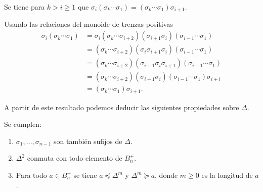\documentclass[bibtex, anon]{TEMat-article}
\begin{document}
\begin{lema}\label{anterior}
Se tiene para $k>i\geq 1$ que $\sigma_i(\sigma_k\cdots\sigma_1)=(\sigma_k\cdots\sigma_1)\sigma_{i+1}$.
\end{lema}
\begin{demostracion}
Usando las relaciones del monoide de trenzas positivas
		\begin{align*}
		\sigma_i(\sigma_k\cdots\sigma_1)&=\sigma_i(\sigma_k\cdots\sigma_{i+2})(\sigma_{i+1}\sigma_i)(\sigma_{i-1}\cdots\sigma_1)\\
		&=(\sigma_k\cdots\sigma_{i+2})(\sigma_i\sigma_{i+1}\sigma_i)(\sigma_{i-1}\cdots\sigma_1)\\
		&=(\sigma_k\cdots\sigma_{i+2})(\sigma_{i+1}\sigma_i\sigma_{i+1})(\sigma_{i-1}\cdots\sigma_1)\\
		&=(\sigma_k\cdots\sigma_{i+2})(\sigma_{i+1}\sigma_i)(\sigma_{i-1}\cdots\sigma_1)\sigma_{i+i}\\
		&=(\sigma_k\cdots\sigma_1)\sigma_{i+1}.
		\end{align*}
\end{demostracion}


A partir de este resultado podemos deducir las siguientes propiedades sobre $\Delta$.


\begin{proposicion}\label{sufijos} Se cumplen:
	\begin{enumerate}
		\item $\sigma_1,\dots,\sigma_{n-1}$ son también sufijos de $\Delta$.
		\item $\Delta^2$ conmuta con todo elemento de $B_n^+$.
		\item Para todo $a\in B_n^+$ se tiene $a\preccurlyeq\Delta^m$ y $\Delta^m\succcurlyeq a$, donde  $m\geq 0$ es la longitud de $a$.
	\end{enumerate}
	
\end{proposicion}
\end{document}
